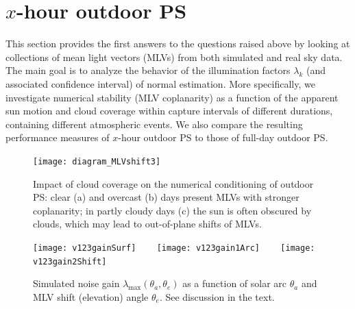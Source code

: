 \section{$x$-hour outdoor PS}
\label{sec:analysis}

This section provides the first answers to the questions raised above by looking at collections of mean light vectors (MLVs) from both simulated and real sky data. The main goal is to analyze the behavior of the illumination factors $\lambda_k$ (and associated confidence interval) of normal estimation. More specifically, we investigate numerical stability (MLV coplanarity) as a function of the apparent sun motion and cloud coverage within capture intervals of different durations, containing different atmospheric events. We also compare the resulting performance measures of $x$-hour outdoor PS to those of full-day outdoor PS.


\begin{figure}[t]
\centering
\texttt{[image: diagram\_MLVshift3]}
\caption{Impact of cloud coverage on the numerical conditioning of outdoor PS: clear (a) and overcast (b) days present MLVs with stronger coplanarity; in partly cloudy days (c) the sun is often obscured by clouds, which may lead to out-of-plane shifts of MLVs.}
\label{fig:MLVshift}
\end{figure}
\begin{figure}[t]
\centering
\texttt{[image: v123gainSurf]} \ \ \ %
\texttt{[image: v123gain1Arc]} \ \ \ %
\texttt{[image: v123gain2Shift]}
\caption{Simulated noise gain $\lambda_{\max}(\theta_a,\theta_e)$ as a function of solar arc $\theta_a$ and MLV shift (elevation) angle $\theta_e$. See discussion in the text.}
\label{fig:v123gain}
\end{figure}

